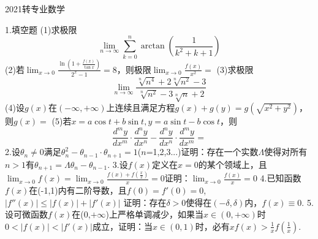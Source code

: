 \documentclass{article}
\begin{document}
\centerline{2021转专业数学}
1.填空题\newline
(1)求极限
\[\lim_{n \to \infty} \sum_{k = 0}^{n} \arctan (\frac{1}{k^2+k+1})\]
(2)若$ \lim_{x \to 0} \frac{\ln (1+\frac{f(x)}{\tan x})}{2^x-1}=8 $，则极限$ \lim_{x \to 0}\frac{f(x)}{x^2}=$\newline
(3)求极限\[\lim_{n \to \infty}\frac{\sqrt[n]{n^4}+2\sqrt[n]{n^2}-3}{\sqrt[n]{n^2}-3\sqrt[n]{n}+2}\]
(4)设$ g(x)$在$ (-\infty,+\infty)$上连续且满足方程$g(x)+g(y)=g(\sqrt{x^2+y^2}) $，则$g(x)=$ \newline
(5)若$x=a\cos t+b\sin t,y=a\sin t-b\cos t $，则
\[\frac{d^m y}{d x^m}\cdot \frac{d^n y}{d x^n} -\frac{d^n y}{d x^n} \cdot \frac{d^m y}{d x^m} = \]
2.设$\theta_n\neq 0$满足$\theta_n^2-\theta_{n-1}\cdot \theta_{n+1}=1$($n$=1,2,3...)证明：存在一个实数$\varLambda $使得对所有$n>1$有$\theta_{n+1}=\varLambda\theta_{n}-\theta_{n-1} $.\newline
3.设$f(x)$定义在$x=0$的某个领域上，且$\lim_{x \to 0} f(x)=\lim_{x \to 0} \frac{f(x)+f(\frac{x}{2})}{x}=0 $证明：$ \lim_{x \to 0}\frac{f(x)}{x}=0 $\newline
4.已知函数$f(x)$在(-1,1)内有二阶导数，且$f(0)=f'(0)=0$,$\left\lvert f''(x)\right\rvert \leq \left\lvert f(x)\right\rvert +\left\lvert f'(x)\right\rvert$ 证明：存在$ \delta>0$使得在$ (-\delta,\delta)$内，$f(x)\equiv 0$.\newline
5.设可微函数$f(x)$在(0,$ +\infty$)上严格单调减少，如果当$x\in (0,+\infty) $时$0<|f(x)|<|f'(x)| $成立，证明：当$ x\in(0,1)$时，必有$xf(x)>\frac{1}{x}f(\frac{1}{x}) $.
\end{document}
